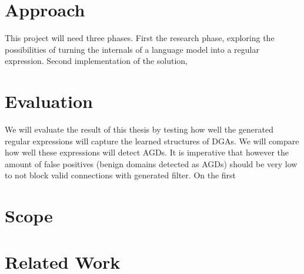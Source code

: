 \documentclass[a4paper, 12pt]{article}
\begin{document}
\section{Approach}
This project will need three phases. First the research phase, exploring the possibilities of
turning the internals of a language model into a regular expression. Second implementation of the
solution, 

\section{Evaluation}
We will evaluate the result of this thesis by testing how well the generated regular expressions
will capture the learned structures of DGAs. We will compare how well these expressions will detect
AGDs. It is imperative that however the amount of false positives (benign domains detected as AGDs)
should be very low to not block valid connections with generated filter.
On the first

\section{Scope}

\section{Related Work}

\clearpage

\printbibliography
\end{document}
